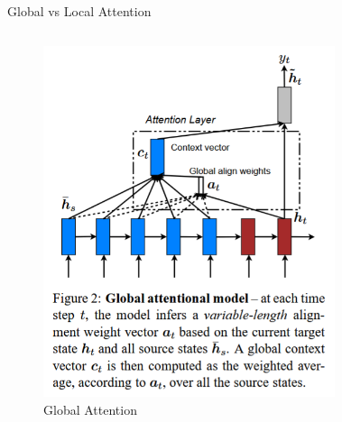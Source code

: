 \documentclass{beamer}
\begin{document}
\begin{frame}{Global vs Local Attention \cite{luong2015effective}}
\begin{columns}[c]
    \begin{figure}
      \centering
      \includegraphics[width=\linewidth]{assets/global attention.png}
      \caption*{Global Attention}
    \end{figure}
    \begin{figure}
      \centering

\end{figure}
\end{columns}
\end{frame}
\end{document}
